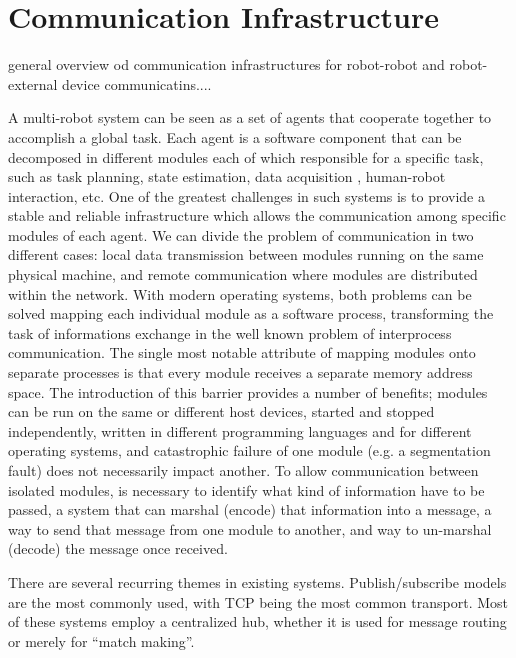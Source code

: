 \section{Communication Infrastructure}

general overview od communication infrastructures for robot-robot and robot-external device communicatins....




A multi-robot system can be seen as a set of agents that cooperate together to accomplish a global task. Each agent is a software component that can be decomposed in different modules each of which responsible for a specific task, such as task planning, state estimation, data acquisition , human-robot interaction, etc. 
One of the greatest challenges in such systems is to provide a stable and reliable infrastructure which allows the communication among specific modules of each agent.
We can divide the problem of communication in two different cases: local data transmission between  modules running on the same physical machine, and remote communication where modules are distributed within the network.
With modern operating systems, both problems can be solved mapping each individual module as a software process, transforming the task of informations exchange in the well known problem of interprocess communication.
The single most notable attribute of mapping modules onto separate processes is that every module receives a separate memory address space. The introduction of this barrier provides a number of benefits; modules can be run on the same or different host devices, started and stopped independently, written in different programming languages and for different operating systems, and catastrophic failure of one module (e.g. a segmentation fault) does not necessarily impact another. To allow communication between isolated modules, is necessary to identify what kind of information have to be passed,  a system that can marshal (encode) that information into a message, a way to send that message from one module to another, and way to un-marshal (decode) the message once received.

There are several recurring themes in existing systems. Publish/subscribe models are the most commonly used, with TCP being the most common transport. Most of these systems employ a centralized hub, whether it is used for message routing or merely for “match making”. 

